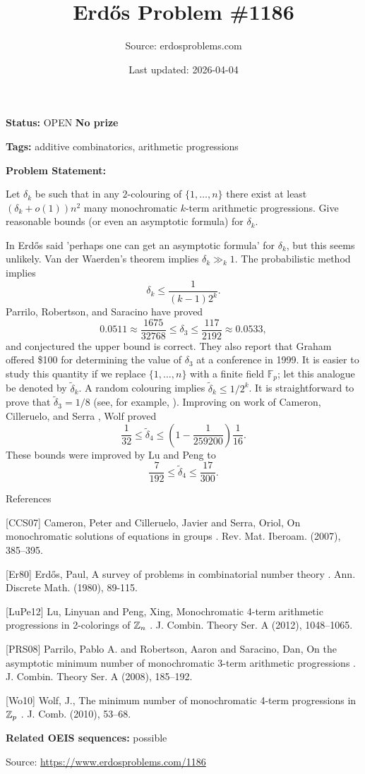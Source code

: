 \documentclass{article}
\title{Erd\H{o}s Problem \#1186}
\date{Last updated: 2026-04-04}
\author{Source: erdosproblems.com}
\begin{document}
\maketitle

\noindent\textbf{Status:} OPEN \quad \textbf{No prize}

\noindent\textbf{Tags:} additive combinatorics, arithmetic progressions

\medskip

\noindent\textbf{Problem Statement:}

Let $\delta_k$ be such that in any $2$-colouring of $\{1,\ldots,n\}$ there exist at least $(\delta_k+o(1))n^2$ many monochromatic $k$-term arithmetic progressions. Give reasonable bounds (or even an asymptotic formula) for $\delta_k$.




In \cite{Er80} Erd\H{o}s said 'perhaps one can get an asymptotic formula' for $\delta_k$, but this seems unlikely. Van der Waerden's theorem implies $\delta_k\gg_k 1$. The probabilistic method implies\[\delta_k \leq \frac{1}{(k-1)2^{k}}.\]Parrilo, Robertson, and Saracino \cite{PRS08} have proved\[0.0511\approx \frac{1675}{32768}\leq \delta_3 \leq \frac{117}{2192}\approx 0.0533,\]and conjectured the upper bound is correct. They also report that Graham offered \$100 for determining the value of $\delta_3$ at a conference in 1999. It is easier to study this quantity if we replace $\{1,\ldots,n\}$ with a finite field $\mathbb{F}_p$; let this analogue be denoted by $\tilde{\delta}_k$. A random colouring implies $\tilde{\delta}_k\leq 1/2^{k}$. It is straightforward to prove that $\tilde{\delta}_3=1/8$ (see, for example, \cite{Wo10}). Improving on work of Cameron, Cilleruelo, and Serra \cite{CCS07}, Wolf \cite{Wo10} proved\[\frac{1}{32}\leq \tilde{\delta}_4\leq \left(1-\frac{1}{259200}\right)\frac{1}{16}.\]These bounds were improved by Lu and Peng \cite{LuPe12} to\[\frac{7}{192}\leq \tilde{\delta}_4\leq \frac{17}{300}.\]




References

[CCS07] Cameron, Peter and Cilleruelo, Javier and Serra, Oriol, On monochromatic solutions of equations in groups . Rev. Mat. Iberoam. (2007), 385--395.

[Er80] Erd\H{o}s, Paul, A survey of problems in combinatorial number theory . Ann. Discrete Math. (1980), 89-115.

[LuPe12] Lu, Linyuan and Peng, Xing, Monochromatic 4-term arithmetic progressions in 2-colorings of {$\Bbb Z_n$} . J. Combin. Theory Ser. A (2012), 1048--1065.

[PRS08] Parrilo, Pablo A. and Robertson, Aaron and Saracino, Dan, On the asymptotic minimum number of monochromatic 3-term arithmetic progressions . J. Combin. Theory Ser. A (2008), 185--192.

[Wo10] Wolf, J., The minimum number of monochromatic 4-term progressions in {$\Bbb Z_p$} . J. Comb. (2010), 53--68.

\noindent\textbf{Related OEIS sequences:} possible


\bigskip
\noindent\small{Source: \url{https://www.erdosproblems.com/1186}}
\end{document}
